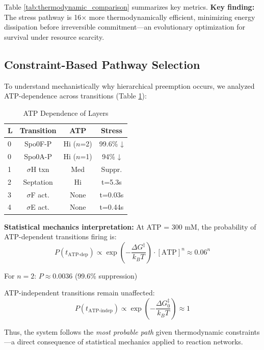 \documentclass[twocolumn,11pt]{article}
\begin{document}
Table \ref{tab:thermodynamic_comparison} summarizes key metrics. \textbf{Key finding:} The stress pathway is 16× more thermodynamically efficient, minimizing energy dissipation before irreversible commitment—an evolutionary optimization for survival under resource scarcity.

\subsection{Constraint-Based Pathway Selection}

To understand mechanistically why hierarchical preemption occurs, we analyzed ATP-dependence across transitions (Table \ref{tab:atp_dependence}):

\begin{table}[h]
\centering
\small
\caption{ATP Dependence of Layers}
\label{tab:atp_dependence}
\begin{tabular}{@{}lccc@{}}
\toprule
\textbf{L} & \textbf{Transition} & \textbf{ATP} & \textbf{Stress} \\
\midrule
0 & Spo0F-P & Hi ($n$=2) & 99.6\% ↓ \\
0 & Spo0A-P & Hi ($n$=1) & 94\% ↓ \\
1 & $\sigma$H txn & Med & Suppr. \\
2 & Septation & Hi & t=5.3s \\
3 & $\sigma$F act. & None & t=0.03s \\
4 & $\sigma$E act. & None & t=0.44s \\
\bottomrule
\end{tabular}
\end{table}

\textbf{Statistical mechanics interpretation:} At ATP = 300 mM, the probability of ATP-dependent transitions firing is:
\begin{equation}
    P(t_{\text{ATP-dep}}) \propto \exp\left(-\frac{\Delta G^\ddagger}{k_B T}\right) \cdot [\text{ATP}]^n \approx 0.06^n
\end{equation}

For $n=2$: $P \approx 0.0036$ (99.6\% suppression)

ATP-independent transitions remain unaffected:
\begin{equation}
    P(t_{\text{ATP-indep}}) \propto \exp\left(-\frac{\Delta G_0^\ddagger}{k_B T}\right) \approx 1
\end{equation}

Thus, the system follows the \textit{most probable path} given thermodynamic constraints—a direct consequence of statistical mechanics applied to reaction networks.
\end{document}
